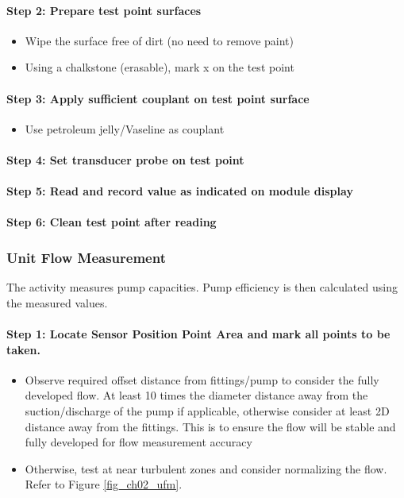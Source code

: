 
\paragraph{Step 2: Prepare test point surfaces}
\begin{itemize}
\item	Wipe the surface free of dirt (no need to remove paint)
\item	Using a chalkstone (erasable), mark x on the test point
\end{itemize}

\paragraph{Step 3: Apply sufficient couplant on test point surface}
\begin{itemize}
\item	Use petroleum jelly/Vaseline as couplant
\end{itemize}

\paragraph{Step 4: Set transducer probe on test point}

\paragraph{Step 5: Read and record value as indicated on module display} 


\paragraph{Step 6: Clean test point after reading}

\subsubsection{Unit Flow Measurement}
The activity measures pump capacities. Pump efficiency is then calculated using the measured values.  

\paragraph{Step 1: Locate Sensor Position Point Area and mark all points to be taken.}

\begin{itemize}
	\item Observe required offset distance from fittings/pump to consider the fully developed flow. At least 10 times the diameter distance away from the suction/discharge of the pump if applicable, otherwise consider at least 2D distance away from the fittings. This is to ensure the flow will be stable and fully developed for flow measurement accuracy %
	\item Otherwise, test at near turbulent zones and consider normalizing the flow. Refer to Figure \ref{fig_ch02_ufm}.
\end{itemize}

